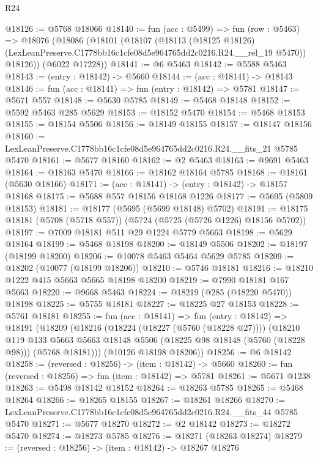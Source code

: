 \begin{lexlean}{R24}
\begin{coremodule}
@18126 := @5768 @18066
@18140 := fun (acc : @5499) =>
  fun (row : @5463) =>
  @18076
    (@18086
      (@18101
        (@18107
          (@18113
            (@18125 @18126)
            (LexLeanPreserve.C1778bb16c1cfe08d5e964765dd2c0216.R24.__rel_19 @5470))
          @18126))
      (@6022 @17228))
@18141 := @6 @5463
@18142 := @5588 @5463
@18143 := (entry : @18142) -> @5660
@18144 := (acc : @18141) -> @18143
@18146 := fun (acc : @18141) => fun (entry : @18142) => @5781
@18147 := @5671 @557
@18148 := @5630 @5785
@18149 := @5468 @18148
@18152 := @5592 @5463 @285 @5629
@18153 := @18152 @5470
@18154 := @5468 @18153
@18155 := @18154 @5506
@18156 := @18149 @18155
@18157 := @18147 @18156
@18160 := LexLeanPreserve.C1778bb16c1cfe08d5e964765dd2c0216.R24.__fits_21 @5785 @5470
@18161 := @5677 @18160
@18162 := @2 @5463
@18163 := @9691 @5463
@18164 := @18163 @5470
@18166 := @18162 @18164 @5785
@18168 := @18161 (@5630 @18166)
@18171 := (acc : @18141) -> (entry : @18142) -> @18157 @18168
@18175 := @5688 @557 @18156 @18168 @1226
@18177 := @5695 (@5809 @18153)
@18181 := @18177 (@5695 (@5699 @18148) @5702)
@18191 := @18175 @18181 (@5708 (@5718 @557)) (@5724 (@5725 (@5726 @1226) @18156 @5702))
@18197 := @7009 @18181 @511 @29 @1224 @5779 @5663
@18198 := @5629 @18164
@18199 := @5468 @18198
@18200 := @18149 @5506
@18202 := @18197 (@18199 @18200)
@18206 := @10078 @5463 @5464 @5629 @5785
@18209 := @18202 (@10077 (@18199 @18206))
@18210 := @5746 @18181
@18216 := @18210 @1222 @415 @5663 @5665 @18198 @18200
@18219 := @7990 @18181 @167 @5663
@18220 := @9668 @5463
@18224 := @18219 (@285 (@18220 @5470)) @18198
@18225 := @5755 @18181
@18227 := @18225 @27 @18153
@18228 := @5761 @18181
@18255 := fun (acc : @18141) =>
  fun (entry : @18142) =>
  @18191
    (@18209
      (@18216
        (@18224 (@18227 (@5760 (@18228 @27))))
        (@18210
          @119
          @133
          @5663
          @5663
          @18148
          @5506
          (@18225 @98 @18148 (@5760 (@18228 @98)))
          (@5768 @18181)))
      (@10126 @18198 @18206))
@18256 := @6 @18142
@18258 := (reversed : @18256) -> (item : @18142) -> @5660
@18260 := fun (reversed : @18256) => fun (item : @18142) => @5781
@18261 := @5671 @1238
@18263 := @5498 @18142 @18152
@18264 := @18263 @5785
@18265 := @5468 @18264
@18266 := @18265 @18155
@18267 := @18261 @18266
@18270 := LexLeanPreserve.C1778bb16c1cfe08d5e964765dd2c0216.R24.__fits_44 @5785 @5470
@18271 := @5677 @18270
@18272 := @2 @18142
@18273 := @18272 @5470
@18274 := @18273 @5785
@18276 := @18271 (@18263 @18274)
@18279 := (reversed : @18256) -> (item : @18142) -> @18267 @18276

\end{coremodule}
\end{lexlean}

